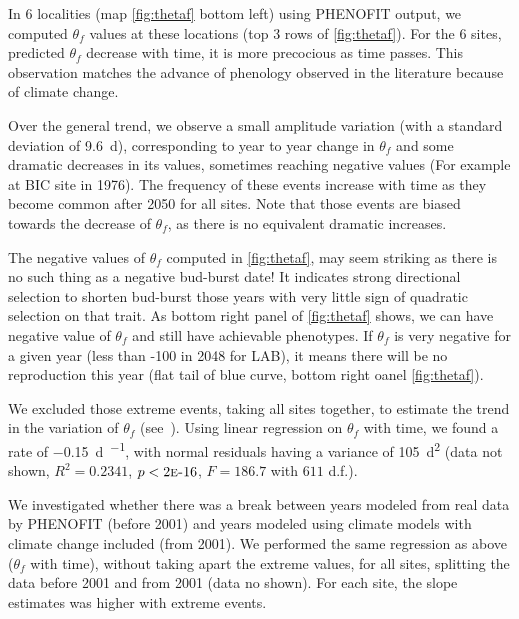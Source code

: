 In 6 localities (map \autoref{fig:thetaf} bottom left) using \textsc{PHENOFIT} output, we computed $\theta_f$ values at these locations (top 3 rows of \autoref{fig:thetaf}). For the 6 sites, predicted $\theta_f$ decrease with time, it is more precocious as time passes. This observation matches the advance of phenology observed in the literature because of climate change.

Over the general trend, we observe a small amplitude variation (with a standard deviation of \SI{9.6}{\day}), corresponding to year to year change in $\theta_f$ and some dramatic decreases in its values, sometimes reaching negative values (For example at BIC site in 1976). The frequency of these events increase with time as they become common after 2050 for all sites. Note that those events are biased towards the decrease of $\theta_f$, as there is no equivalent dramatic increases.

The negative values of $\theta_f$ computed in \autoref{fig:thetaf}, may seem striking as there is no such thing as a negative bud-burst date! It indicates strong directional selection to shorten bud-burst those years with very little sign of quadratic selection on that trait. As bottom right panel of \autoref{fig:thetaf} shows, we can have negative value of $\theta_f$ and still have achievable phenotypes. If $\theta_f$ is very negative for a given year (less than -100 in 2048 for LAB), it means there will be no reproduction this year (flat tail of blue curve, bottom right oanel \autoref{fig:thetaf}).

We excluded those extreme events, taking all sites together, to estimate the trend in the variation of $\theta_f$ (see~). Using linear regression on $\theta_f$ with time, we found a rate of \SI{-0.15}{\day\per\year}, with normal residuals having a variance of \SI{105}{\day\squared} (data not shown, $R^2=0.2341$, $p<2\text{\sc{e}-}16$, $F=186.7$ with $611$ d.f.).

We investigated whether there was a break between years modeled from real data by \textsc{PHENOFIT} (before 2001) and years modeled using climate models with climate change included (from 2001). We performed the same regression as above ($\theta_f$ with time), without taking apart the extreme values, for all sites, splitting the data before 2001 and from 2001 (data no shown). For each site, the slope estimates was higher with extreme events.